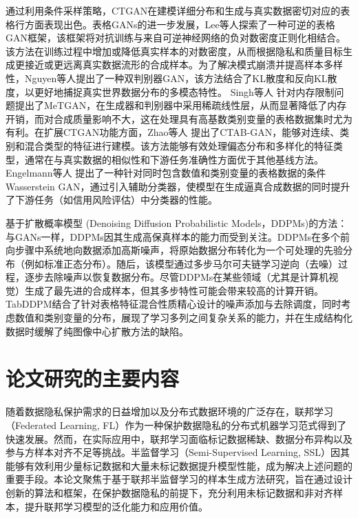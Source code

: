 通过利用条件采样策略，CTGAN在建模详细分布和生成与真实数据密切对应的表格行方面表现出色。表格GANs的进一步发展，Lee等人\citep{lee2021invertible}探索了一种可逆的表格GAN框架，该框架将对抗训练与来自可逆神经网络的负对数密度正则化相结合。该方法在训练过程中增加或降低真实样本的对数密度，从而根据隐私和质量目标生成更接近或更远离真实数据流形的合成样本。为了解决模式崩溃并提高样本多样性，Nguyen等人\citep{nguyen2017dual}提出了一种双判别器GAN，该方法结合了KL散度和反向KL散度，以更好地捕捉真实世界数据分布的多模态特性。 Singh等人\citep{singh2021metgan} 针对内存限制问题提出了MeTGAN，在生成器和判别器中采用稀疏线性层，从而显著降低了内存开销，而对合成质量影响不大，这在处理具有高基数类别变量的表格数据集时尤为有利。在扩展CTGAN功能方面，Zhao等人\citep{zhao2021ctab} 提出了CTAB-GAN，能够对连续、类别和混合类型的特征进行建模。该方法能够有效处理偏态分布和多样化的特征类型，通常在与真实数据的相似性和下游任务准确性方面优于其他基线方法。 Engelmann等人\citep{engelmann2021conditional} 提出了一种针对同时包含数值和类别变量的表格数据的条件Wasserstein GAN，通过引入辅助分类器，使模型在生成逼真合成数据的同时提升了下游任务（如信用风险评估）中分类器的性能。

基于扩散概率模型 (Denoising Diffusion Probabilistic Models，DDPMs)\citep{ho2020denoising}的方法：与GANs一样，DDPMs因其生成高保真样本的能力而受到关注。DDPMs在多个前向步骤中系统地向数据添加高斯噪声，将原始数据分布转化为一个可处理的先验分布（例如标准正态分布）。随后，该模型通过多步马尔可夫链学习逆向（去噪）过程，逐步去除噪声以恢复数据分布。尽管DDPMs在某些领域（尤其是计算机视觉）生成了最先进的合成样本，但其多步特性可能会带来较高的计算开销。TabDDPM结合了针对表格特征混合性质精心设计的噪声添加与去除调度，同时考虑数值和类别变量的分布，展现了学习多列之间复杂关系的能力，并在生成结构化数据时缓解了纯图像中心扩散方法的缺陷\citep{kotelnikov2023tabddpm}。

\section{论文研究的主要内容}
随着数据隐私保护需求的日益增加以及分布式数据环境的广泛存在，联邦学习（Federated Learning, FL）作为一种保护数据隐私的分布式机器学习范式得到了快速发展。然而，在实际应用中，联邦学习面临标记数据稀缺、数据分布异构以及参与方样本对齐不足等挑战。半监督学习（Semi-Supervised Learning, SSL）因其能够有效利用少量标记数据和大量未标记数据提升模型性能，成为解决上述问题的重要手段。本论文聚焦于基于联邦半监督学习的样本生成方法研究，旨在通过设计创新的算法和框架，在保护数据隐私的前提下，充分利用未标记数据和非对齐样本，提升联邦学习模型的泛化能力和应用价值。

